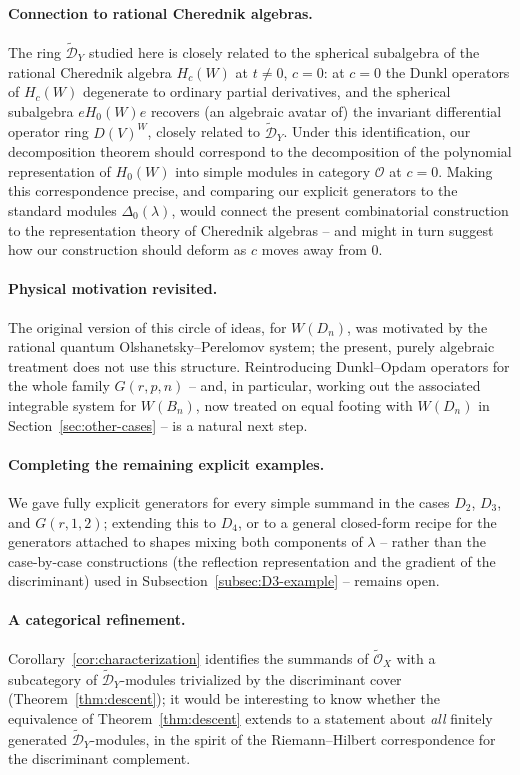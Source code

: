 \documentclass[11pt,a4paper]{article}
\begin{document}
\paragraph{Connection to rational Cherednik algebras.} The ring
$\widetilde{\mathcal{D}}_Y$ studied here is closely related to the
spherical subalgebra of the rational Cherednik algebra $H_c(W)$ at
$t \ne 0$, $c=0$: at $c=0$ the Dunkl operators of $H_c(W)$ degenerate
to ordinary partial derivatives, and the spherical subalgebra
$eH_0(W)e$ recovers (an algebraic avatar of) the invariant
differential operator ring $D(V)^W$, closely related to
$\widetilde{\mathcal{D}}_Y$. Under this identification, our
decomposition theorem should correspond to the decomposition of the
polynomial representation of $H_0(W)$ into simple modules in category
$\mathcal{O}$ at $c=0$. Making this correspondence precise, and
comparing our explicit generators to the standard modules
$\Delta_0(\lambda)$, would connect the present combinatorial
construction to the representation theory of Cherednik algebras --
and might in turn suggest how our construction should deform as $c$
moves away from $0$.

\paragraph{Physical motivation revisited.} The original version of
this circle of ideas, for $W(D_n)$, was motivated by the rational
quantum Olshanetsky--Perelomov system; the present, purely algebraic
treatment does not use this structure. Reintroducing Dunkl--Opdam
operators for the whole family $G(r,p,n)$ -- and, in particular,
working out the associated integrable system for $W(B_n)$, now
treated on equal footing with $W(D_n)$ in
Section~\ref{sec:other-cases} -- is a natural next step.

\paragraph{Completing the remaining explicit examples.} We gave fully
explicit generators for every simple summand in the cases $D_2$,
$D_3$, and $G(r,1,2)$; extending this to $D_4$, or to a general
closed-form recipe for the generators attached to shapes mixing both
components of $\lambda$ -- rather than the case-by-case constructions
(the reflection representation and the gradient of the discriminant)
used in Subsection~\ref{subsec:D3-example} -- remains open.

\paragraph{A categorical refinement.} Corollary~\ref{cor:characterization}
identifies the summands of $\widetilde{\mathcal{O}}_X$ with a
subcategory of $\widetilde{\mathcal{D}}_Y$-modules trivialized by the
discriminant cover (Theorem~\ref{thm:descent}); it would be
interesting to know whether the equivalence of
Theorem~\ref{thm:descent} extends to a statement about \emph{all}
finitely generated $\widetilde{\mathcal{D}}_Y$-modules, in the spirit
of the Riemann--Hilbert correspondence for the discriminant complement.
\end{document}
